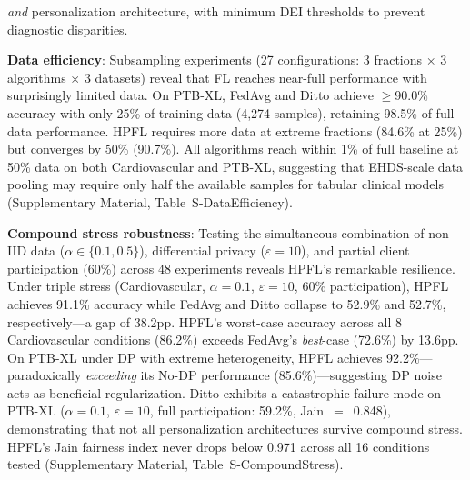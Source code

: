 \documentclass[conference,a4paper]{IEEEtran}
\begin{document}
\textit{and} personalization architecture, with minimum DEI thresholds to prevent diagnostic disparities.

\textbf{Data efficiency}: Subsampling experiments (27 configurations: 3 fractions $\times$ 3 algorithms $\times$ 3 datasets) reveal that FL reaches near-full performance with surprisingly limited data. On PTB-XL, FedAvg and Ditto achieve $\geq$90.0\% accuracy with only 25\% of training data (4,274 samples), retaining 98.5\% of full-data performance. HPFL requires more data at extreme fractions (84.6\% at 25\%) but converges by 50\% (90.7\%). All algorithms reach within 1\% of full baseline at 50\% data on both Cardiovascular and PTB-XL, suggesting that EHDS-scale data pooling may require only half the available samples for tabular clinical models (Supplementary Material, Table~S-DataEfficiency).

\textbf{Compound stress robustness}: Testing the simultaneous combination of non-IID data ($\alpha \in \{0.1, 0.5\}$), differential privacy ($\varepsilon{=}10$), and partial client participation (60\%) across 48 experiments reveals HPFL's remarkable resilience. Under triple stress (Cardiovascular, $\alpha{=}0.1$, $\varepsilon{=}10$, 60\% participation), HPFL achieves 91.1\% accuracy while FedAvg and Ditto collapse to 52.9\% and 52.7\%, respectively---a gap of 38.2pp. HPFL's worst-case accuracy across all 8 Cardiovascular conditions (86.2\%) exceeds FedAvg's \textit{best}-case (72.6\%) by 13.6pp. On PTB-XL under DP with extreme heterogeneity, HPFL achieves 92.2\%---paradoxically \textit{exceeding} its No-DP performance (85.6\%)---suggesting DP noise acts as beneficial regularization. Ditto exhibits a catastrophic failure mode on PTB-XL ($\alpha{=}0.1$, $\varepsilon{=}10$, full participation: 59.2\%, Jain~$=$~0.848), demonstrating that not all personalization architectures survive compound stress. HPFL's Jain fairness index never drops below 0.971 across all 16 conditions tested (Supplementary Material, Table~S-CompoundStress).
\end{document}

